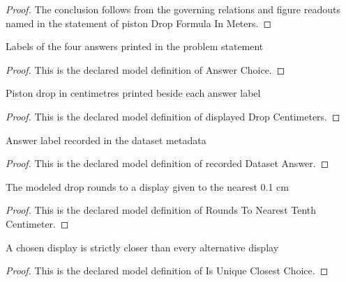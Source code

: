 \begin{proof}
  The conclusion follows from the governing relations and figure readouts named in the statement of piston Drop Formula In Meters.
\end{proof}
\begin{definition}
  \label{def:physics:phyx-mini-0447:phyxminiproblems-problemphyxmini0447-answerchoice}
  Labels of the four answers printed in the problem statement
\end{definition}
\begin{proof}
  This is the declared model definition of Answer Choice.
\end{proof}
\begin{definition}
  \label{def:physics:phyx-mini-0447:phyxminiproblems-problemphyxmini0447-displayeddropcentimeters}
  Piston drop in centimetres printed beside each answer label
\end{definition}
\begin{proof}
  This is the declared model definition of displayed Drop Centimeters.
\end{proof}
\begin{definition}
  \label{def:physics:phyx-mini-0447:phyxminiproblems-problemphyxmini0447-recordeddatasetanswer}
  Answer label recorded in the dataset metadata
\end{definition}
\begin{proof}
  This is the declared model definition of recorded Dataset Answer.
\end{proof}
\begin{definition}
  \label{def:physics:phyx-mini-0447:phyxminiproblems-problemphyxmini0447-roundstonearesttenthcentimeter}
  The modeled drop rounds to a display given to the nearest 0.1 cm
\end{definition}
\begin{proof}
  This is the declared model definition of Rounds To Nearest Tenth Centimeter.
\end{proof}
\begin{definition}
  \label{def:physics:phyx-mini-0447:phyxminiproblems-problemphyxmini0447-isuniqueclosestchoice}
  A chosen display is strictly closer than every alternative display
\end{definition}
\begin{proof}
  This is the declared model definition of Is Unique Closest Choice.
\end{proof}
